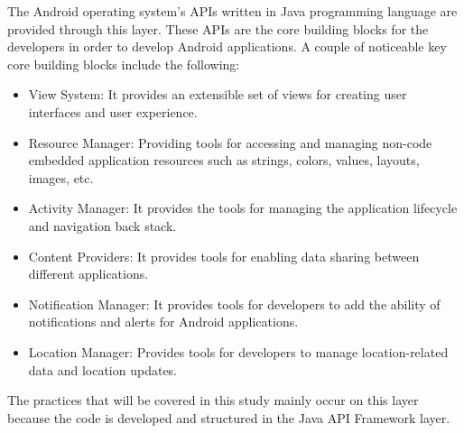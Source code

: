 The Android operating system's APIs written in Java programming language are provided through this layer. These APIs are the core building blocks for the developers in order to develop Android applications. A couple of noticeable key core building blocks include the following:
\begin{itemize}
\item View System: It provides an extensible set of views for creating user interfaces and user experience.
\item Resource Manager: Providing tools for accessing and managing non-code embedded application resources such as strings, colors, values, layouts, images, etc.
\item Activity Manager: It provides the tools for managing the application lifecycle and navigation back stack.
\item Content Providers: It provides tools for enabling data sharing between different applications.
\item Notification Manager: It provides tools for developers to add the ability of notifications and alerts for Android applications.
\item Location Manager: Provides tools for developers to manage location-related data and location updates.
\end{itemize}
The practices that will be covered in this study mainly occur on this layer because the code is developed and structured in the Java API Framework layer.